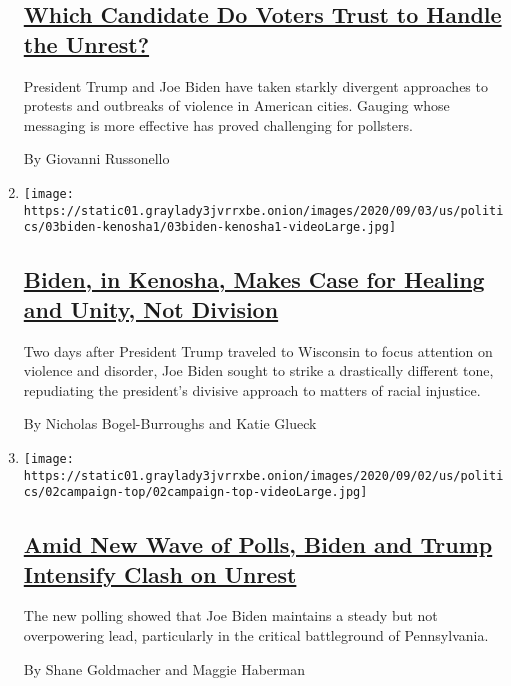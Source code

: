 \begin{enumerate}
  \hypertarget{which-candidate-do-voters-trust-to-handle-the-unrest}{%
  \subsection{\texorpdfstring{\href{/2020/09/04/us/politics/trump-biden-protests-polling.html}{Which
  Candidate Do Voters Trust to Handle the
  Unrest?}}{Which Candidate Do Voters Trust to Handle the Unrest?}}\label{which-candidate-do-voters-trust-to-handle-the-unrest}}

  President Trump and Joe Biden have taken starkly divergent approaches
  to protests and outbreaks of violence in American cities. Gauging
  whose messaging is more effective has proved challenging for
  pollsters.

  By Giovanni Russonello
\item
  \texttt{[image: https://static01.graylady3jvrrxbe.onion/images/2020/09/03/us/politics/03biden-kenosha1/03biden-kenosha1-videoLarge.jpg]}

  \hypertarget{biden-in-kenosha-makes-case-for-healing-and-unity-not-division}{%
  \subsection{\texorpdfstring{\href{/2020/09/03/us/politics/joe-biden-kenosha.html}{Biden,
  in Kenosha, Makes Case for Healing and Unity, Not
  Division}}{Biden, in Kenosha, Makes Case for Healing and Unity, Not Division}}\label{biden-in-kenosha-makes-case-for-healing-and-unity-not-division}}

  Two days after President Trump traveled to Wisconsin to focus
  attention on violence and disorder, Joe Biden sought to strike a
  drastically different tone, repudiating the president's divisive
  approach to matters of racial injustice.

  By Nicholas Bogel-Burroughs and Katie Glueck
\item
  \texttt{[image: https://static01.graylady3jvrrxbe.onion/images/2020/09/02/us/politics/02campaign-top/02campaign-top-videoLarge.jpg]}

  \hypertarget{amid-new-wave-of-polls-biden-and-trump-intensify-clash-on-unrest}{%
  \subsection{\texorpdfstring{\href{/2020/09/02/us/politics/biden-ads-trump.html}{Amid
  New Wave of Polls, Biden and Trump Intensify Clash on
  Unrest}}{Amid New Wave of Polls, Biden and Trump Intensify Clash on Unrest}}\label{amid-new-wave-of-polls-biden-and-trump-intensify-clash-on-unrest}}

  The new polling showed that Joe Biden maintains a steady but not
  overpowering lead, particularly in the critical battleground of
  Pennsylvania.

  By Shane Goldmacher and Maggie Haberman
\end{enumerate}

